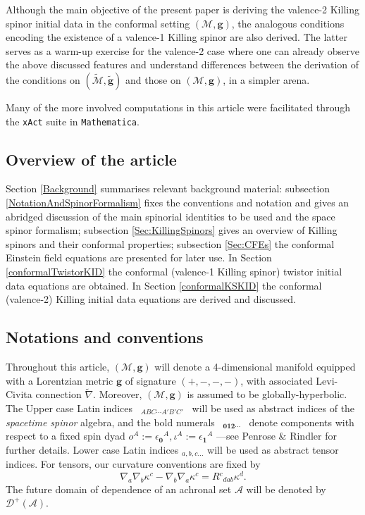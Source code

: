\documentclass[10pt,a4paper]{article}
\theoremstyle{plain}
\def\bmg{{\bm g}}
\begin{document}
    Although the main objective of the present paper is deriving the
    valence-2 Killing spinor initial data in the conformal setting
    $(\mathcal{M},\bmg)$, the analogous conditions encoding the
    existence of a valence-1 Killing spinor are also derived.  The
    latter serves as a warm-up exercise for the valence-2 case where
    one can already observe the above discussed features and
    understand differences between the derivation of the conditions on
    $(\tilde{\mathcal{M}},\tilde{\bmg})$ and those on
    $(\mathcal{M},\bmg)$, in a simpler arena.

\medskip


Many of the more involved computations in this article were
facilitated through the {\tt xAct} suite in {\tt Mathematica}.



\subsection*{Overview of the article}
  Section \ref{Background} summarises relevant background material:
  subsection \ref{NotationAndSpinorFormalism} fixes the conventions
  and notation and gives an abridged discussion of the main spinorial
  identities to be used and the space spinor formalism; subsection
  \ref{Sec:KillingSpinors} gives an overview of Killing spinors and
  their conformal properties; subsection \ref{Sec:CFEs} the conformal
  Einstein field equations are presented for later use.  In Section
  \ref{conformalTwistorKID} the conformal (valence-1 Killing spinor)
  twistor initial data equations are obtained. In Section
  \ref{conformalKSKID} the conformal (valence-2) Killing initial data
  equations are derived and discussed.


\subsection*{Notations and conventions}

Throughout this article, $(\mathcal{M}, \bmg)$ will denote a
4-dimensional manifold equipped with a Lorentzian metric $\bmg$ of
signature $(+, -, -, -)$, with associated Levi-Civita connection
$\tilde{\nabla}$.  Moreover, $(\mathcal{M}, \bmg)$ is assumed to be
globally-hyperbolic. The Upper case Latin indices ~$_{ABC\cdots
  A'B'C'}$~ will be used as abstract indices of the \emph{spacetime
spinor} algebra, and the bold numerals ~$_{\bm0\bm1\bm2\cdots}$~
denote components with respect to a fixed spin dyad $ o^A:=
\epsilon_{\bm0}{}^A,\iota^A:=\epsilon_{\bm1}{}^A $ ---see Penrose \&
Rindler \cite{PenRin84} for further details.  Lower case Latin indices
$_{a,b,c...}$ will be used as abstract tensor indices.  For tensors,
our curvature conventions are fixed by
\[\nabla_{a}\nabla_{b}\kappa^c-\nabla_{b}\nabla_{a}\kappa^c=R{}^{c}{}_{dab}\kappa^{d}.\]
The future domain of dependence of an achronal set $\mathcal{A}$ will
be denoted by $\mathcal{D}^{+}(\mathcal{A})$.
\end{document}
